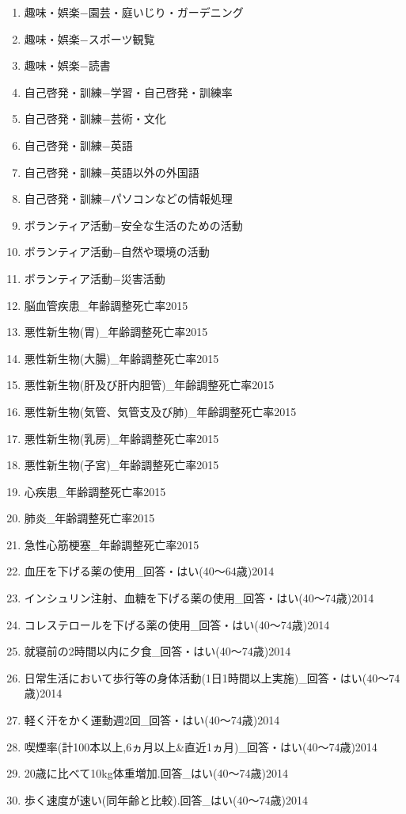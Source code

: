 \begin{multicols}{2}
\begin{enumerate}
  \item 趣味・娯楽−園芸・庭いじり・ガーデニング
  \item 趣味・娯楽−スポーツ観覧
  \item 趣味・娯楽−読書
  \item 自己啓発・訓練−学習・自己啓発・訓練率
  \item 自己啓発・訓練−芸術・文化
  \item 自己啓発・訓練−英語
  \item 自己啓発・訓練−英語以外の外国語
  \item 自己啓発・訓練−パソコンなどの情報処理
  \item ボランティア活動−安全な生活のための活動
  \item ボランティア活動−自然や環境の活動
  \item ボランティア活動−災害活動
  \item 脳血管疾患\_年齢調整死亡率2015
  \item 悪性新生物(胃)\_年齢調整死亡率2015
  \item 悪性新生物(大腸)\_年齢調整死亡率2015
  \item 悪性新生物(肝及び肝内胆管)\_年齢調整死亡率2015
  \item 悪性新生物(気管、気管支及び肺)\_年齢調整死亡率2015
  \item 悪性新生物(乳房)\_年齢調整死亡率2015
  \item 悪性新生物(子宮)\_年齢調整死亡率2015
  \item 心疾患\_年齢調整死亡率2015
  \item 肺炎\_年齢調整死亡率2015
  \item 急性心筋梗塞\_年齢調整死亡率2015
  \item 血圧を下げる薬の使用\_回答・はい(40〜64歳)2014
  \item インシュリン注射、血糖を下げる薬の使用\_回答・はい(40〜74歳)2014
  \item コレステロールを下げる薬の使用\_回答・はい(40〜74歳)2014
  \item 就寝前の2時間以内に夕食\_回答・はい(40〜74歳)2014
  \item 日常生活において歩行等の身体活動(1日1時間以上実施)\_回答・はい(40〜74歳)2014
  \item 軽く汗をかく運動週2回\_回答・はい(40〜74歳)2014
  \item 喫煙率(計100本以上,6ヵ月以上\&直近1ヵ月)\_回答・はい(40〜74歳)2014
  \item 20歳に比べて10kg体重増加.回答\_はい(40〜74歳)2014
  \item 歩く速度が速い(同年齢と比較).回答\_はい(40〜74歳)2014

\end{enumerate}
\end{multicols}
